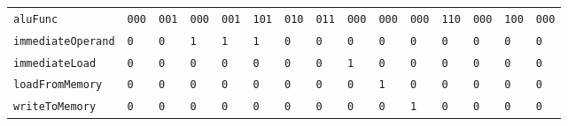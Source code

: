\documentclass[a4paper, english]{article}
\numberwithin{equation}{section}
\begin{document}
\begin{table}[H]
{\begin{tabular}{lllllllllllllll}
            \texttt{aluFunc}          & \texttt{000}  & \texttt{001}  & \texttt{000}  & \texttt{001}  & \texttt{101}  & \texttt{010}  & \texttt{011}  & \texttt{000}   & \texttt{000}  & \texttt{000}   & \texttt{110}  & \texttt{000}  & \texttt{100}  & \texttt{000}  \\
            \texttt{immediateOperand} & \texttt{0}    & \texttt{0}    & \texttt{1}    & \texttt{1}    & \texttt{1}    & \texttt{0}    & \texttt{0}    & \texttt{0}     & \texttt{0}    & \texttt{0}     & \texttt{0}    & \texttt{0}    & \texttt{0}    & \texttt{0}    \\
            \texttt{immediateLoad}    & \texttt{0}    & \texttt{0}    & \texttt{0}    & \texttt{0}    & \texttt{0}    & \texttt{0}    & \texttt{0}    & \texttt{1}     & \texttt{0}    & \texttt{0}     & \texttt{0}    & \texttt{0}    & \texttt{0}    & \texttt{0}    \\
            \texttt{loadFromMemory}   & \texttt{0}    & \texttt{0}    & \texttt{0}    & \texttt{0}    & \texttt{0}    & \texttt{0}    & \texttt{0}    & \texttt{0}     & \texttt{1}    & \texttt{0}     & \texttt{0}    & \texttt{0}    & \texttt{0}    & \texttt{0}    \\
            \texttt{writeToMemory}    & \texttt{0}    & \texttt{0}    & \texttt{0}    & \texttt{0}    & \texttt{0}    & \texttt{0}    & \texttt{0}    & \texttt{0}     & \texttt{0}    & \texttt{1}     & \texttt{0}    & \texttt{0}    & \texttt{0}    & \texttt{0}    \\
            \bottomrule
        \end{tabular}
    }
\end{table}
\end{document}
